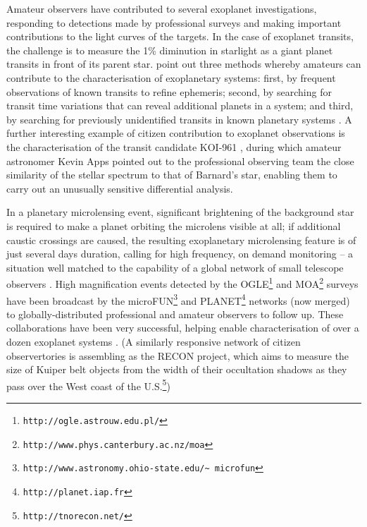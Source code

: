 \documentclass{ar2e}
\def\CaseStudy#1{\noindent{\it\bf #1 \,\,\,\,}}
\def\url#1{\texttt{#1}}
\begin{document}

\CaseStudy{Transiting and Microlensing Exoplanets.}  
Amateur observers have contributed to several exoplanet investigations,
responding to detections made by professional surveys and making important
contributions to the light curves of the targets. In the case of exoplanet
transits, the challenge is to measure the 1\% diminution in starlight as a
giant planet transits in front of its parent star. \citet{14mousis_proam}
point out three methods whereby amateurs can contribute to the
characterisation of exoplanetary systems: first, by frequent observations of
known transits to refine ephemeris; second, by searching for transit time
variations that can reveal additional planets in a system; and third, by
searching for previously unidentified transits in known planetary systems
\citep[e.g., the discovery of the transit of HD 80606b from a 30 cm telescope
near London,][]{09fossey}.  A further interesting example of citizen
contribution to exoplanet observations is the characterisation of the transit
candidate KOI-961 \citep{Muirhead2012},  during which amateur astronomer Kevin
Apps pointed out to  the professional observing  team the close similarity of
the stellar spectrum to that of Barnard's star, enabling them to carry out an
unusually sensitive differential analysis. 

In a planetary microlensing event, significant brightening of the background
star is required to make a planet orbiting the microlens visible at all; if
additional caustic crossings are caused, the resulting exoplanetary
microlensing feature is of just several days duration, calling for high
frequency, on demand monitoring -- a situation well matched to the capability
of a global network of small telescope observers \citep[see e.g.\
][]{Christie2006}. High magnification events detected by the 
OGLE\footnote{\url{http://ogle.astrouw.edu.pl/}} and
MOA\footnote{\url{http://www.phys.canterbury.ac.nz/moa}} surveys have been
broadcast by the
microFUN\footnote{\url{http://www.astronomy.ohio-state.edu/\textasciitilde
microfun}} and PLANET\footnote{\url{http://planet.iap.fr}} networks (now
merged) to globally-distributed professional and amateur observers to follow
up. These collaborations have been very successful, helping enable
characterisation of over a dozen exoplanet systems \citep[see e.g.\ ][and
references therein]{Udalski++2005,Gould++2014}. (A similarly responsive
network of citizen observertories is assembling as the RECON project, which
aims to measure the size of Kuiper belt objects from the width of their
occultation shadows as they pass over the West coast of the
U.S.\footnote{\url{http://tnorecon.net/}})
\end{document}
